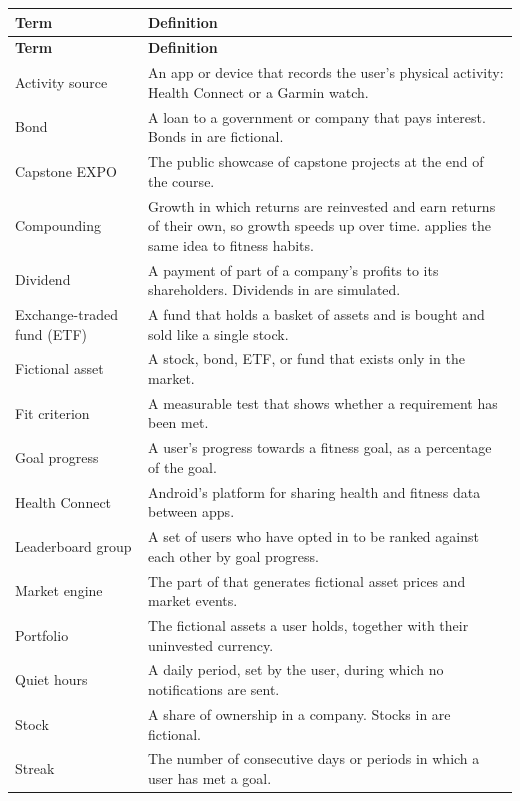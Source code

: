 \documentclass[12pt]{article}
\begin{document}
\small
\begin{xltabular}{\textwidth}{|p{4cm}|X|}
\hline
\textbf{Term} & \textbf{Definition} \\
\hline
\endfirsthead
\hline
\textbf{Term} & \textbf{Definition} \\
\hline
\endhead
Activity source & An app or device that records the user's physical activity: Health Connect or a Garmin watch. \\
\hline
Bond & A loan to a government or company that pays interest. Bonds in \progname{} are fictional. \\
\hline
Capstone EXPO & The public showcase of capstone projects at the end of the course. \\
\hline
Compounding & Growth in which returns are reinvested and earn returns of their own, so growth speeds up over time. \progname{} applies the same idea to fitness habits. \\
\hline
Dividend & A payment of part of a company's profits to its shareholders. Dividends in \progname{} are simulated. \\
\hline
Exchange-traded fund (ETF) & A fund that holds a basket of assets and is bought and sold like a single stock. \\
\hline
Fictional asset & A stock, bond, ETF, or fund that exists only in the \progname{} market. \\
\hline
Fit criterion & A measurable test that shows whether a requirement has been met. \\
\hline
Goal progress & A user's progress towards a fitness goal, as a percentage of the goal. \\
\hline
Health Connect & Android's platform for sharing health and fitness data between apps. \\
\hline
Leaderboard group & A set of users who have opted in to be ranked against each other by goal progress. \\
\hline
Market engine & The part of \progname{} that generates fictional asset prices and market events. \\
\hline
Portfolio & The fictional assets a user holds, together with their uninvested currency. \\
\hline
Quiet hours & A daily period, set by the user, during which no notifications are sent. \\
\hline
Stock & A share of ownership in a company. Stocks in \progname{} are fictional. \\
\hline
Streak & The number of consecutive days or periods in which a user has met a goal. \\

\end{xltabular}
\end{document}
